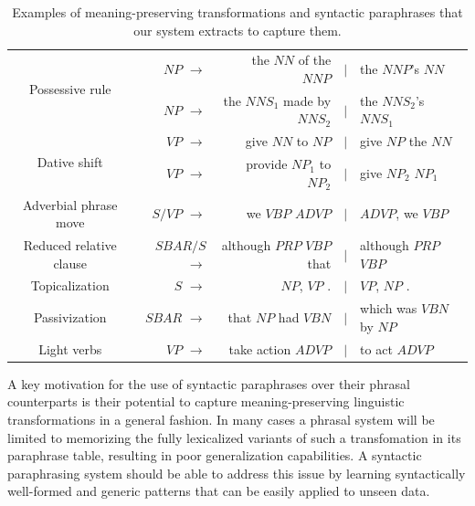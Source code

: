 \documentclass[11pt]{article}
\begin{document}
\begin{table}[!ht]
  \begin{center}
  \begin{tabular}{|c|rrcl|}
    \hline
    \multirow{2}{*}{Possessive rule} & $\mathit{NP}$ $\rightarrow$ & the
    $\mathit{NN}$ of the $\mathit{NNP}$ & $\mid$ & the
    $\mathit{NNP}$'s $\mathit{NN}$ \\
    & $\mathit{NP}$ $\rightarrow$  & the $\mathit{NNS}_1$ made by
    $\mathit{NNS}_2$ & $\mid$ & the $\mathit{NNS}_2$'s
    $\mathit{NNS}_1$ \\
    \hline
    \multirow{2}{*}{Dative shift} & $\mathit{VP}$ $\rightarrow$ & give
    $\mathit{NN}$ to $\mathit{NP}$ & $\mid$ & give $\mathit{NP}$ the
    $\mathit{NN}$ \\
    & $\mathit{VP}$ $\rightarrow$ & provide $\mathit{NP}_1$ to
    $\mathit{NP}_2$ & $\mid$ & give $\mathit{NP}_2$
    $\mathit{NP}_1$ \\
    \hline
    \hline
    Adverbial phrase move & 
    $\mathit{S/VP}$ $\rightarrow$ & we $\mathit{VBP}$ $\mathit{ADVP}$
    & $\mid$ & $\mathit{ADVP}$, we $\mathit{VBP}$ \\
    \hline
    Reduced relative clause & $\mathit{SBAR/S}$ $\rightarrow$ &
    although $\mathit{PRP}$ $\mathit{VBP}$ that & $\mid$ &although $\mathit{PRP}$ $\mathit{VBP}$ \\
    \hline
    Topicalization  & $\mathit{S}$ $\rightarrow$ & $\mathit{NP}$,
    $\mathit{VP}$ . & $\mid$ & $\mathit{VP}$, $\mathit{NP}$ . \\
    \hline
    \hline
    Passivization &
    $\mathit{SBAR}$ $\rightarrow$ & that $\mathit{NP}$ had
    $\mathit{VBN}$ & $\mid$ & which was $\mathit{VBN}$ by $\mathit{NP}$ \\
    \hline
    Light verbs & $\mathit{VP}$ $\rightarrow$ & take action $\mathit{ADVP}$ &
    $\mid$ & to act $\mathit{ADVP}$ \\
    \hline
\end{tabular}
\end{center}
\caption{Examples of meaning-preserving transformations and syntactic
  paraphrases that our system extracts to capture them.}
\label{example_rules}
\end{table}


A key motivation for the use of syntactic paraphrases over their
phrasal counterparts is their potential to capture meaning-preserving
linguistic transformations in a general fashion. In many cases a
phrasal system will be limited to memorizing the fully lexicalized
variants of such a transfomation in its paraphrase table, resulting in
poor generalization capabilities. A syntactic paraphrasing system
should be able to address this issue by learning syntactically
well-formed and generic patterns that can be easily applied to unseen
data.
\end{document}

